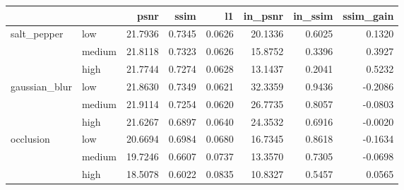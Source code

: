 \begin{tabular}{llrrrrrr}
\toprule
 &  & psnr & ssim & l1 & in_psnr & in_ssim & ssim_gain \\
\midrule
\multirow[t]{3}{*}{salt_pepper} & low & 21.7936 & 0.7345 & 0.0626 & 20.1336 & 0.6025 & 0.1320 \\
 & medium & 21.8118 & 0.7323 & 0.0626 & 15.8752 & 0.3396 & 0.3927 \\
 & high & 21.7744 & 0.7274 & 0.0628 & 13.1437 & 0.2041 & 0.5232 \\
\cline{1-8}
\multirow[t]{3}{*}{gaussian_blur} & low & 21.8630 & 0.7349 & 0.0621 & 32.3359 & 0.9436 & -0.2086 \\
 & medium & 21.9114 & 0.7254 & 0.0620 & 26.7735 & 0.8057 & -0.0803 \\
 & high & 21.6267 & 0.6897 & 0.0640 & 24.3532 & 0.6916 & -0.0020 \\
\cline{1-8}
\multirow[t]{3}{*}{occlusion} & low & 20.6694 & 0.6984 & 0.0680 & 16.7345 & 0.8618 & -0.1634 \\
 & medium & 19.7246 & 0.6607 & 0.0737 & 13.3570 & 0.7305 & -0.0698 \\
 & high & 18.5078 & 0.6022 & 0.0835 & 10.8327 & 0.5457 & 0.0565 \\
\cline{1-8}
\bottomrule
\end{tabular}
